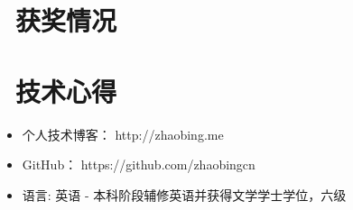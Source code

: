 \documentclass{resume}
\begin{document}

\section{\faStar\ 获奖情况}

\section{\faHeart\ 技术心得}
\begin{itemize}[parsep=0.5ex]
  \item 个人技术博客\faLink ： http://zhaobing.me
  \item GitHub\faLink ： https://github.com/zhaobingcn
  \item 语言: 英语 - 本科阶段辅修英语并获得文学学士学位，六级
\end{itemize}

%
%
\end{document}
